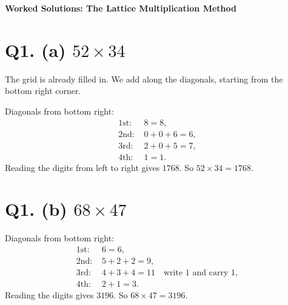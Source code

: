 \documentclass[12pt,a4paper]{article}
\newcommand{\lsetup}[2]{%
  \edef\lC{\the\numexpr#1\relax}\edef\lR{\the\numexpr#2\relax}%
  \edef\lCm{\the\numexpr#1-1\relax}\edef\lRm{\the\numexpr#2-1\relax}}
\newcommand{\lgrid}{%
  \draw[thick] (0,0) rectangle (\lC,\lR);
  \foreach \i in {1,...,\lCm}{\draw (\i,0) -- (\i,\lR);}
  \foreach \j in {1,...,\lRm}{\draw (0,\j) -- (\lC,\j);}
  \foreach \i in {1,...,\lC}{\foreach \j in {1,...,\lR}{%
    \draw[gray!75] ({\i-1},{\j-1}) -- (\i,\j);}}}
\newcommand{\ltop}[2]{\node[font=\small] at ({#1-0.5},{\lR+0.34}) {#2};}
\newcommand{\lside}[2]{\node[font=\small] at ({\lC+0.34},{\lR-#1+0.5}) {#2};}
\newcommand{\lcell}[4]{%
  \node[font=\small] at ({#1-0.72},{\lR-#2+0.70}) {#3};
  \node[font=\small] at ({#1-0.28},{\lR-#2+0.30}) {#4};}
\newcommand{\lleft}[2]{\node[font=\small] at (-0.44,{\lR-#1+0.5}) {#2};}
\newcommand{\lbot}[2]{\node[font=\small] at ({#1-0.5},-0.42) {#2};}
\begin{document}
\begin{center}
  {\Large\bfseries Worked Solutions: The Lattice Multiplication Method}\\[6pt]
\end{center}

\section*{Q1. (a) $52\times34$}
The grid is already filled in. We add along the diagonals, starting from the bottom right corner.
\begin{center}
\end{center}
Diagonals from bottom right:
\[
\begin{aligned}
\text{1st: } & 8 = 8,\\
\text{2nd: } & 0+0+6 = 6,\\
\text{3rd: } & 2+0+5 = 7,\\
\text{4th: } & 1 = 1.
\end{aligned}
\]
Reading the digits from left to right gives $1768$. So $52\times34=1768$.

\section*{Q1. (b) $68\times47$}
\begin{center}
\end{center}
Diagonals from bottom right:
\[
\begin{aligned}
\text{1st: } & 6 = 6,\\
\text{2nd: } & 5+2+2 = 9,\\
\text{3rd: } & 4+3+4 = 11 \quad \text{write } 1 \text{ and carry } 1,\\
\text{4th: } & 2+1 = 3.
\end{aligned}
\]
Reading the digits gives $3196$. So $68\times47=3196$.
\end{document}

